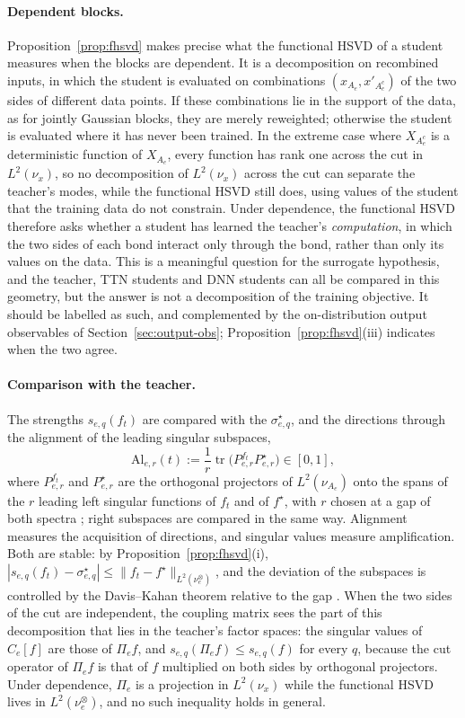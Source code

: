 \documentclass[11pt]{article}
\newcommand{\norm}[1]{\lVert #1\rVert}
\theoremstyle{definition}
\numberwithin{equation}{section}
\begin{document}
\paragraph{Dependent blocks.}
Proposition~\ref{prop:fhsvd} makes precise what the functional HSVD of a student measures when the blocks are dependent. It is a decomposition on recombined inputs, in which the student is evaluated on combinations $(x_{A_e},x'_{A_e^c})$ of the two sides of different data points. If these combinations lie in the support of the data, as for jointly Gaussian blocks, they are merely reweighted; otherwise the student is evaluated where it has never been trained. In the extreme case where $X_{A_e^c}$ is a deterministic function of $X_{A_e}$, every function has rank one across the cut in $L^2(\nu_x)$, so no decomposition of $L^2(\nu_x)$ across the cut can separate the teacher's modes, while the functional HSVD still does, using values of the student that the training data do not constrain. Under dependence, the functional HSVD therefore asks whether a student has learned the teacher's \emph{computation}, in which the two sides of each bond interact only through the bond, rather than only its values on the data. This is a meaningful question for the surrogate hypothesis, and the teacher, TTN students and DNN students can all be compared in this geometry, but the answer is not a decomposition of the training objective. It should be labelled as such, and complemented by the on-distribution output observables of Section~\ref{sec:output-obs}; Proposition~\ref{prop:fhsvd}(iii) indicates when the two agree.

\paragraph{Comparison with the teacher.}
The strengths $s_{e,q}(f_t)$ are compared with the $\sigma^\star_{e,q}$, and the directions through the alignment of the leading singular subspaces,
\[
\mathrm{Al}_{e,r}(t):=\frac1r\operatorname{tr}\big(P^{f_t}_{e,r}P^\star_{e,r}\big)\in[0,1],
\]
where $P^{f_t}_{e,r}$ and $P^\star_{e,r}$ are the orthogonal projectors of $L^2(\nu_{A_e})$ onto the spans of the $r$ leading left singular functions of $f_t$ and of $f^\star$, with $r$ chosen at a gap of both spectra \citep[Section~9.4]{hfl_diagonal}; right subspaces are compared in the same way. Alignment measures the acquisition of directions, and singular values measure amplification. Both are stable: by Proposition~\ref{prop:fhsvd}(i), $|s_{e,q}(f_t)-\sigma^\star_{e,q}|\le\norm{f_t-f^\star}_{L^2(\nu^\otimes_e)}$, and the deviation of the subspaces is controlled by the Davis--Kahan theorem relative to the gap \citep[Section~8.3]{hfl_local}. When the two sides of the cut are independent, the coupling matrix sees the part of this decomposition that lies in the teacher's factor spaces: the singular values of $C_e[f]$ are those of $\Pi_ef$, and $s_{e,q}(\Pi_ef)\le s_{e,q}(f)$ for every $q$, because the cut operator of $\Pi_ef$ is that of $f$ multiplied on both sides by orthogonal projectors. Under dependence, $\Pi_e$ is a projection in $L^2(\nu_x)$ while the functional HSVD lives in $L^2(\nu^\otimes_e)$, and no such inequality holds in general.
\end{document}
